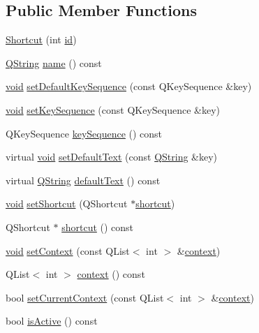 \subsection*{\-Public \-Member \-Functions}
\begin{DoxyCompactItemize}
\item 
\hyperlink{group___core_plugin_ga48cb263cbfb499d8cb9b6d536b002bc7}{\-Shortcut} (int \hyperlink{group___core_plugin_gac039f1f888e5c7bd1a5d46458aeb1610}{id})
\item 
\hyperlink{group___u_a_v_objects_plugin_gab9d252f49c333c94a72f97ce3105a32d}{\-Q\-String} \hyperlink{group___core_plugin_ga7ec7f71adfdc3c6b35e6170469379326}{name} () const 
\item 
\hyperlink{group___u_a_v_objects_plugin_ga444cf2ff3f0ecbe028adce838d373f5c}{void} \hyperlink{group___core_plugin_gaa079869e33f968d489f8db585bf751f1}{set\-Default\-Key\-Sequence} (const \-Q\-Key\-Sequence \&key)
\item 
\hyperlink{group___u_a_v_objects_plugin_ga444cf2ff3f0ecbe028adce838d373f5c}{void} \hyperlink{group___core_plugin_ga20c5a7f37d12f285984afd56cabe133a}{set\-Key\-Sequence} (const \-Q\-Key\-Sequence \&key)
\item 
\-Q\-Key\-Sequence \hyperlink{group___core_plugin_gab1e3a78b0e8f9b7f8d8f586aecc0634c}{key\-Sequence} () const 
\item 
virtual \hyperlink{group___u_a_v_objects_plugin_ga444cf2ff3f0ecbe028adce838d373f5c}{void} \hyperlink{group___core_plugin_gaef3954d263a7c24936207d8c45b45aa7}{set\-Default\-Text} (const \hyperlink{group___u_a_v_objects_plugin_gab9d252f49c333c94a72f97ce3105a32d}{\-Q\-String} \&key)
\item 
virtual \hyperlink{group___u_a_v_objects_plugin_gab9d252f49c333c94a72f97ce3105a32d}{\-Q\-String} \hyperlink{group___core_plugin_ga29a73f08bcec4b0ff2ce91efa7c49a74}{default\-Text} () const 
\item 
\hyperlink{group___u_a_v_objects_plugin_ga444cf2ff3f0ecbe028adce838d373f5c}{void} \hyperlink{group___core_plugin_gaa0e0fd029473e19b4eb09270e581fd90}{set\-Shortcut} (\-Q\-Shortcut $\ast$\hyperlink{group___core_plugin_ga0a8d9dc0a089aa779ff29b23b1cd895f}{shortcut})
\item 
\-Q\-Shortcut $\ast$ \hyperlink{group___core_plugin_ga0a8d9dc0a089aa779ff29b23b1cd895f}{shortcut} () const 
\item 
\hyperlink{group___u_a_v_objects_plugin_ga444cf2ff3f0ecbe028adce838d373f5c}{void} \hyperlink{group___core_plugin_ga18f3c41267657c81803ed196d33e3e99}{set\-Context} (const \-Q\-List$<$ int $>$ \&\hyperlink{group___core_plugin_ga1e8dc09d7c244c60c76b7f1172d06306}{context})
\item 
\-Q\-List$<$ int $>$ \hyperlink{group___core_plugin_ga1e8dc09d7c244c60c76b7f1172d06306}{context} () const 
\item 
bool \hyperlink{group___core_plugin_ga78bfa0e5af7039a14d90916f62838a9b}{set\-Current\-Context} (const \-Q\-List$<$ int $>$ \&\hyperlink{group___core_plugin_ga1e8dc09d7c244c60c76b7f1172d06306}{context})
\item 
bool \hyperlink{group___core_plugin_ga0cd4c52ee2c1e36aa798b537686b88f5}{is\-Active} () const 
\end{DoxyCompactItemize}


